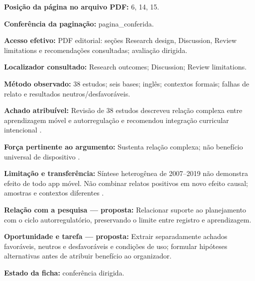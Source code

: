 \noindent\textbf{Posição da página no arquivo PDF:} 6, 14, 15.\par\medskip

\noindent\textbf{Conferência da paginação:} pagina\_conferida.\par\medskip

\noindent\textbf{Acesso efetivo:} PDF editorial: seções Research design, Discussion, Review limitations e recomendações consultadas; avaliação dirigida.\par\medskip

\noindent\textbf{Localizador consultado:} Research outcomes; Discussion; Review limitations.\par\medskip

\noindent\textbf{Método observado:} 38 estudos; seis bases; inglês; contextos formais; falhas de relato e resultados neutros/desfavoráveis.\par\medskip

\noindent\textbf{Achado atribuível:} Revisão de 38 estudos descreveu relação complexa entre aprendizagem móvel e autorregulação e recomendou integração curricular intencional \citep[p. 156, 164–165]{education_palalas2020}.\par\medskip

\noindent\textbf{Força pertinente ao argumento:} Sustenta relação complexa; não benefício universal de dispositivo \citep[p. 156, 164–165]{education_palalas2020}.\par\medskip

\noindent\textbf{Limitação e transferência:} Síntese heterogênea de 2007–2019 não demonstra efeito de todo app móvel. Não combinar relatos positivos em novo efeito causal; amostras e contextos diferentes \citep[p. 156, 164–165]{education_palalas2020}.\par\medskip

\noindent\textbf{Relação com a pesquisa — proposta:} Relacionar suporte ao planejamento com o ciclo autorregulatório, preservando o limite entre registro e aprendizagem.\par\medskip

\noindent\textbf{Oportunidade e tarefa — proposta:} Extrair separadamente achados favoráveis, neutros e desfavoráveis e condições de uso; formular hipóteses alternativas antes de atribuir benefício ao organizador.\par\medskip

\noindent\textbf{Estado da ficha:} conferência dirigida.\par\medskip

